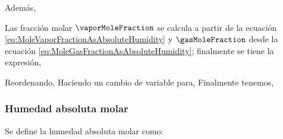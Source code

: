     \eqEnthalpyIdealMolar
    
    Además,
    \eqEnthalpyConversion
    
    Las fracción molar $\vaporMoleFraction$ se calcula a partir de la ecuación \eqref{eq:MoleVaporFractionAsAbsoluteHumidity} y $\gasMoleFraction$ desde la ecuación \eqref{eq:MoleGasFractionAsAbsoluteHumidity}; finalmente se tiene la expresión,
    
    
    \eqEnthalpyExpanded*
    Reordenando,
    \eqEnthalpyExpandedDevelop*
    Haciendo un cambio de variable para,
    \eqCpHumid*
    Finalmente tenemos,
    \eqEnthalpyCompact*
    
\subsubsection{Humedad absoluta molar}
    Se define la humedad absoluta molar como:
    \eqnMolarAbsoluteHumidity 